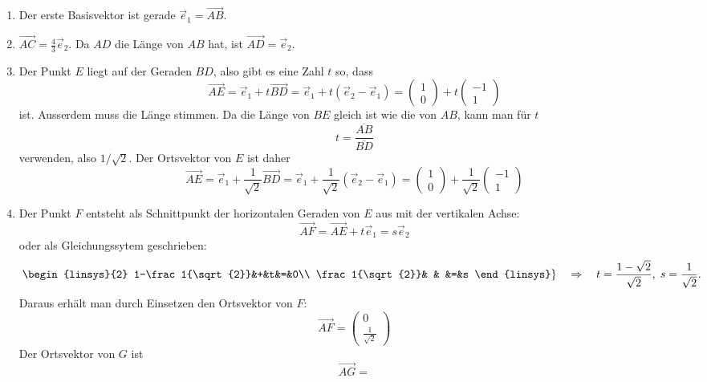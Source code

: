 \begin{loesung}
\begin{teilaufgaben}
\item
\renewcommand{\labelenumii}{\arabic{enumii}.}
\begin{enumerate}
\item Der erste Basisvektor ist gerade $\vec{e}_1=\overrightarrow{AB}$.
\item $\overrightarrow{AC}=\frac43 \vec{e}_2$.
Da $AD$ die Länge von $AB$ hat, ist $\overrightarrow{AD}=\vec{e}_2$.
\item Der Punkt $E$ liegt auf der Geraden $BD$, also gibt es eine
Zahl  $t$ so, dass
\[
\overrightarrow{AE}
=
\vec{e}_1+t\overrightarrow{BD}
=
\vec{e}_1+t(\vec{e}_2-\vec{e}_1)
=
\begin{pmatrix}1\\0\end{pmatrix}+t\begin{pmatrix}-1\\1\end{pmatrix}
\]
ist.
Ausserdem muss die Länge stimmen.
Da die Länge von $BE$ gleich ist wie die von $AB$, kann man für $t$
\[
t=\frac{\overline{AB}}{\overline{BD}}
\]
verwenden, also $1/\sqrt{2}$.
Der Ortsvektor von $E$ ist daher
\[
\overrightarrow{AE}
=
\vec{e}_1+\frac1{\sqrt{2}}\overrightarrow{BD}
=
\vec{e}_1+\frac1{\sqrt{2}}(\vec{e}_2-\vec{e}_1)
=
\begin{pmatrix}1\\0\end{pmatrix}+\frac1{\sqrt{2}}\begin{pmatrix}-1\\1\end{pmatrix}
\]
\item Der Punkt $F$ entsteht als Schnittpunkt der horizontalen Geraden von
$E$ aus mit der vertikalen Achse:
\[
\overrightarrow{AF} = \overrightarrow{AE}+t\vec{e}_1 = s\vec{e}_2
\]
oder als Gleichungssytem geschrieben:
\[
\left.
\begin{linsys}{2}
1-\frac1{\sqrt{2}}&+&t&=&0\\
  \frac1{\sqrt{2}}& & &=&s
\end{linsys}
\right\}
\quad\Rightarrow\quad
t=\frac{1-\sqrt{2}}{\sqrt{2}},
\;
s=\frac{1}{\sqrt{2}}.
\]
Daraus erhält man durch Einsetzen den Ortsvektor von $F$:
\[
\overrightarrow{AF}
=
\begin{pmatrix}
0\\\frac1{\sqrt{2}}
\end{pmatrix}
\]
Der Ortsvektor von $G$ ist
\[
\overrightarrow{AG}
=
\]
\end{enumerate}
\end{teilaufgaben}
\end{loesung}
